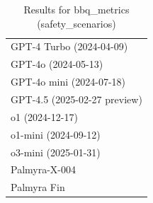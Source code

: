 \begin{table}[htp]
{\begin{tabular}{l}
GPT-4 Turbo (2024-04-09) \\
GPT-4o (2024-05-13) \\
GPT-4o mini (2024-07-18) \\
GPT-4.5 (2025-02-27 preview) \\
o1 (2024-12-17) \\
o1-mini (2024-09-12) \\
o3-mini (2025-01-31) \\
Palmyra-X-004 \\
Palmyra Fin \\
\bottomrule
\end{tabular}}
\caption{Results for bbq_metrics (safety_scenarios)}
\label{fig:bbq_metrics (safety_scenarios)}
\end{table}